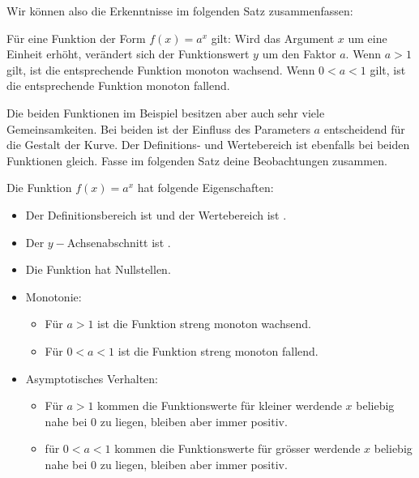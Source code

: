 \documentclass[11pt,oneside]{article}
\begin{document}
	Wir können also die Erkenntnisse im folgenden Satz zusammenfassen:
	\begin{satz}
		Für eine Funktion der Form $f(x)=a^x$ gilt: Wird das Argument $x$ um eine Einheit erhöht, verändert sich der Funktionswert $y$ um den Faktor $a$.\newline
		Wenn $a>1$ gilt, ist die entsprechende Funktion monoton wachsend.\newline
		Wenn $0<a<1$ gilt, ist die entsprechende Funktion monoton fallend.
	\end{satz}
	Die beiden Funktionen im Beispiel besitzen aber auch sehr viele Gemeinsamkeiten. Bei beiden ist der Einfluss des Parameters $a$ entscheidend für die Gestalt der Kurve. Der Definitions- und Wertebereich ist ebenfalls bei beiden Funktionen gleich. Fasse im folgenden Satz deine Beobachtungen zusammen.
	\begin{satz}[Eigenschaften]
		Die Funktion $f(x)=a^x$ hat folgende Eigenschaften:
		\begin{itemize}
			\item Der Definitionsbereich ist  und der Wertebereich ist \gap{2}.
			\item Der $y-$Achsenabschnitt ist \gap{2}.
			\item Die Funktion hat  Nullstellen.
			\item Monotonie:\begin{itemize}
				\item Für $a>1$ ist die Funktion streng monoton wachsend.
				\item Für $0<a<1$ ist die Funktion streng monoton fallend.\end{itemize}
			\item Asymptotisches Verhalten:\begin{itemize}
				\item Für $a>1$ kommen die Funktionswerte für kleiner werdende $x$ beliebig nahe bei $0$ zu liegen, bleiben aber immer positiv.
				\item für $0<a<1$ kommen die Funktionswerte für grösser werdende $x$ beliebig nahe bei $0$ zu liegen, bleiben aber immer positiv. \end{itemize}
		\end{itemize}
	\end{satz}
\end{document}
